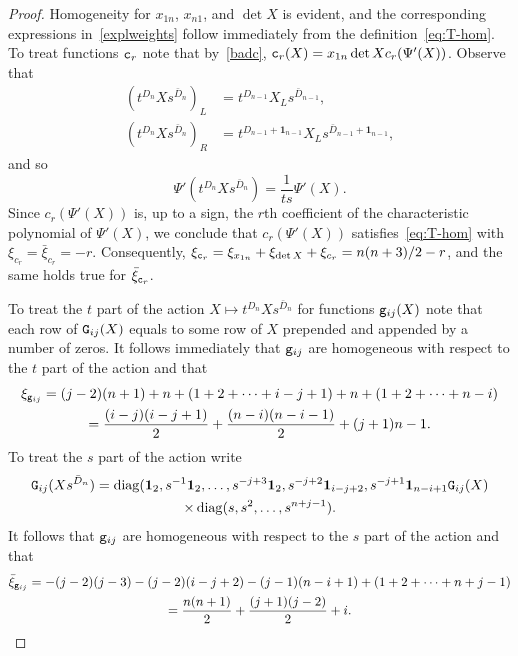 \documentclass{amsart}
\theoremstyle{definition}
\theoremstyle{remark}
\numberwithin{equation}{section}
\numberwithin{theorem}{section}
\def\NG{{\tt G}}
\def\ec{{\tt c}}
\def\eg{{\tt g}}
\def\one{\mathbf 1}
\def\diag{\operatorname{diag}}
\begin{document}
\begin{proof}
Homogeneity for $x_{1n}$, $x_{n1}$, and $\det X$ is evident, and the corresponding expressions in~\eqref{explweights} follow immediately from the definition~\eqref{eq:T-hom}. To treat functions $\ec_r$ note that by~\eqref{badc}, 
$\ec_r(X)=x_{1n}\det X c_r(\Psi'(X))$. Observe that
\begin{align*}
\left ( t^{D_n} X s^{\bar D_n} \right )_L &= t^{D_{n-1}} X_L s^{\bar D_{n-1}}, \\
\left ( t^{D_n} X s^{\bar D_n} \right )_R &= t^{D_{n-1}+\one_{n-1}} X_L s^{\bar D_{n-1}+\one_{n-1}},
\end{align*}
and so
\[
\Psi' \left ( t^{D_n} X s^{\bar D_n} \right ) = \frac{1}{t s} \Psi'(X).
\]
Since $c_r(\Psi'(X))$ is, up to a sign, the $r$th coefficient of the characteristic polynomial of $\Psi'(X)$, we conclude that $c_r(\Psi'(X))$ satisfies~\eqref{eq:T-hom} with $\xi_{c_r}=\bar\xi_{c_r}=-r$. Consequently,
$\xi_{\ec_r}=\xi_{x_{1n}}+\xi_{\det X}+\xi_{c_r}=n(n+3)/2-r$, and the same holds true for $\bar\xi_{\ec_r}$.

To treat the $t$ part of the action $X\mapsto t^{D_n}Xs^{\bar D_n}$ for functions $\eg_{ij}(X)$ note that each row of 
$\NG_{ij}(X)$ equals to some row of $X$ prepended and appended by a number of zeros. It follows immediately that $\eg_{ij}$ are homogeneous with respect to the $t$ part of the action and that
\begin{multline*}
\xi_{\eg_{ij}}=(j-2)(n+1)+n+(1+2+\dots+i-j+1)+n+(1+2+\dots+n-i)\\
=\frac{(i-j)(i-j+1)}2+\frac{(n-i)(n-i-1)}2+(j+1)n-1.
\end{multline*}
To treat the $s$ part of the action write
\begin{multline*}
\NG_{ij}(Xs^{\bar D_n})=\diag(\one_2, s^{-1}\one_2,\dots,s^{-j+3}\one_2,s^{-j+2}\one_{i-j+2},s^{-j+1}\one_{n-i+1}
\NG_{ij}(X)\\
\times\diag(s,s^2,\dots,s^{n+j-1}).
\end{multline*}
It follows that $\eg_{ij}$ are homogeneous with respect to the $s$ part of the action and that
\begin{multline*}
\bar\xi_{\eg_{ij}}=-(j-2)(j-3)-(j-2)(i-j+2)-(j-1)(n-i+1)+(1+2+\dots+n+j-1)\\
=\frac{n(n+1)}2+\frac{(j+1)(j-2)}2+i.
\end{multline*}


\end{proof}
\end{document}
